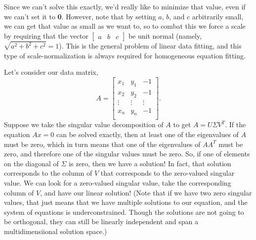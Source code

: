 \documentclass[11pt]{article}
\begin{document}
Since we can't solve this exactly, we'd really like to minimize that value, even if we can't set it
to \textbf{0}. However, note that by setting $a$, $b$, and $c$ arbitrarily small, we can get that
value as small as we want to, so to combat this we force a scale by requiring that the vector
$\begin{bmatrix}a & b & c\end{bmatrix}$ be unit normal (namely, $\sqrt{a^2 + b^2 + c^2} = 1$). This
is the general problem of linear data fitting, and this type of scale-normalization is always
required for homogeneous equation fitting.

Let's consider our data matrix, 
\[A = \begin{bmatrix}
        x_1 & y_1 & -1 \\ x_2 & y_2 & -1 \\ \vdots & \vdots & \vdots \\ x_n & y_n & -1 \\
\end{bmatrix}.\]
Suppose we take the singular value decomposition of $A$ to get $A = U\Sigma V^T$. If the equation
$Ax=0$ can be solved exactly, then at least one of the eigenvalues of $A$ must be zero, which in
turn means that one of the eigenvalues of $AA^T$ must be zero, and therefore one of the singular
values must be zero. So, if one of elements on the diagonal of $\Sigma$ is zero, then we have a
solution! In fact, that solution corresponds to the column of $V$ that corresponds to the
zero-valued singular value. We can look for a zero-valued singular value, take the corresponding
column of $V$, and have our linear solution! (Note that if we have two zero
singular values, that just means that we have multiple solutions to our
equation, and the system of equations is underconstrained.  Though the
solutions are not going to be orthogonal, they can still be linearly
independent and span a multidimensiional solution space.)
\end{document}
